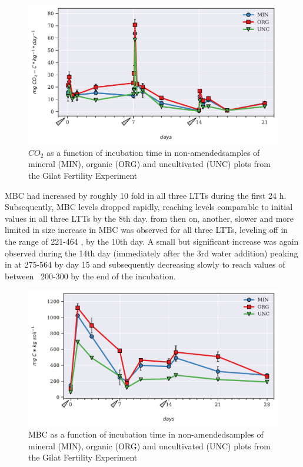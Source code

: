 			\begin{figure}[H]
				\centering
				\includegraphics[scale=0.8, width=\linewidth]{thesis_figures/main_incubation/control/Resp.pdf}
				\caption{$CO_2$  as a function of incubation time in non-amendedsamples of mineral (MIN), organic (ORG) and uncultivated (UNC) plots from the Gilat Fertility Experiment}
				\label{fig:resp_control_main}
			\end{figure}
			\noindent MBC had increased by roughly 10 fold in all three LTTs during the first 24 h. Subsequently, MBC levels dropped rapidly, reaching levels comparable to initial values in all three LTTs by the 8th day. from then on, another, slower and more limited in size increase in MBC was observed for all three LTTs, leveling off in the range of 221-464 \genericunit, by the 10th day. A small but significant increase was again observed during the 14th day (immediately after the 3rd water addition) peaking in at 275-564 \genericunit by day 15 and subsequently decreasing slowly to reach values of between ~200-300 \genericunit by the end of the incubation.\\
			\begin{figure}[H]
				\centering
				\includegraphics[scale=0.8, width=\linewidth]{thesis_figures/main_incubation/control/MBC.pdf}
				\caption{MBC  as a function of incubation time in non-amendedsamples of mineral (MIN), organic (ORG) and uncultivated (UNC) plots from the Gilat Fertility Experiment}
				\label{fig:mbc_control_main}
			\end{figure}
